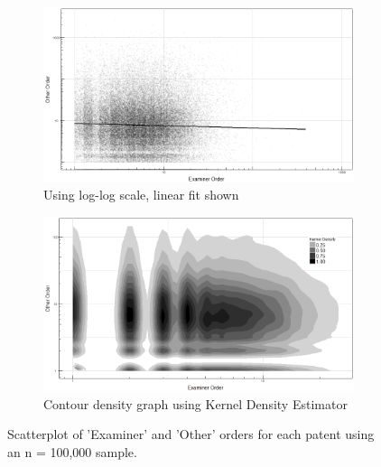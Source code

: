 \begin{figure}
\centering
\begin{subfigure}{\textwidth}
  \centering
  \includegraphics[width=0.9\linewidth]{Figures/orderScatterplot}
 \caption[]{\small Using log-log scale, linear fit shown \newline}
\label{fig:orderScatterplot}
\end{subfigure}%

\begin{subfigure}{\textwidth}
  \centering
  \includegraphics[width=0.9\linewidth]{Figures/orderScatterplotContours}
  \caption[]{\small Contour density graph using Kernel Density Estimator}
\label{fig:orderScatterplotContours}
\end{subfigure}
\caption[Scatterplot of Order for 'Other' and 'Examiner' sub-graphs]{Scatterplot of 'Examiner' and 'Other' orders for each patent using an n = 100,000 sample.}
\label{fig:scatterplots}
\end{figure}

